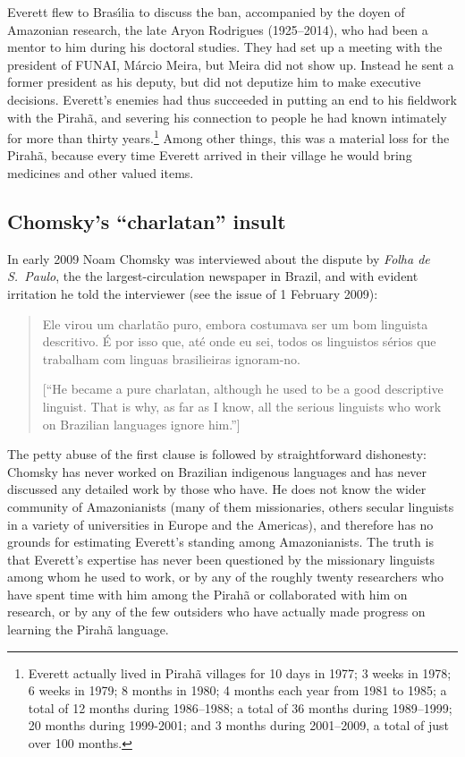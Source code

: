 \documentclass[output=paper,colorlinks,citecolor=brown
]{langscibook}
\begin{document}
Everett flew to Bras{\'\i}lia to discuss the ban, accompanied by the
doyen of Amazonian research, the late Aryon Rodrigues (1925--2014),
who had been a mentor to him during his doctoral studies. They had
set up a meeting with the president of FUNAI, M{\'a}rcio Meira, but
Meira did not show up. Instead he sent a former president as his
deputy, but did not deputize him to make executive decisions.
Everett's enemies had thus succeeded in putting an end to his fieldwork
with the Pirah{\~a}, and severing his connection to people he had known
intimately for more than thirty years.\footnote{%
   Everett actually lived in Pirah{\~a} villages for 10 days in 1977;
   3 weeks in 1978; 6 weeks in 1979; 8 months in 1980; 4 months each year
   from 1981 to 1985; a total of 12 months during 1986--1988; a total of
   36 months during 1989--1999; 20 months during 1999-2001; and 3 months
   during 2001--2009, a total of just over 100 months.}
Among other things, this was a material loss for the Pirah{\~a}, because
every time Everett arrived in their village he would bring medicines and
other valued items.

\subsection{Chomsky's ``charlatan'' insult}

In early 2009 Noam Chomsky was interviewed about the dispute by
\textit{Folha de S.~Paulo}, the the largest-circulation newspaper in
Brazil, and with evident irritation he told the interviewer (see the
issue of 1 February 2009):
\begin{quote}
Ele virou um charlat{\~a}o puro, embora costumava ser um bom linguista
descritivo. {\'E} por isso que, at{\'e} onde eu sei, todos os linguistos
s{\'e}rios que trabalham com linguas brasilieiras ignoram-no.

[``He became a pure charlatan, although he used to be a good descriptive
linguist. That is why, as far as I know, all the serious linguists
who work on Brazilian languages ignore him.'']
\end{quote}

The petty abuse of the first clause is followed by straightforward
dishonesty: Chomsky has never worked on Brazilian indigenous languages
and has never discussed any detailed work by those who have. He does
not know the wider community of Amazonianists (many of them missionaries,
others secular linguists in a variety of universities in Europe and the
Americas), and therefore has no grounds for estimating Everett's standing
among Amazonianists. The truth is that Everett's expertise has never been
questioned by the missionary linguists among whom he used to work, or by
any of the roughly twenty researchers who have spent time with him among
the Pirah{\~a} or collaborated with him on research, or by any of the
few outsiders who have actually made progress on learning the Pirah{\~a}
language.
\end{document}
